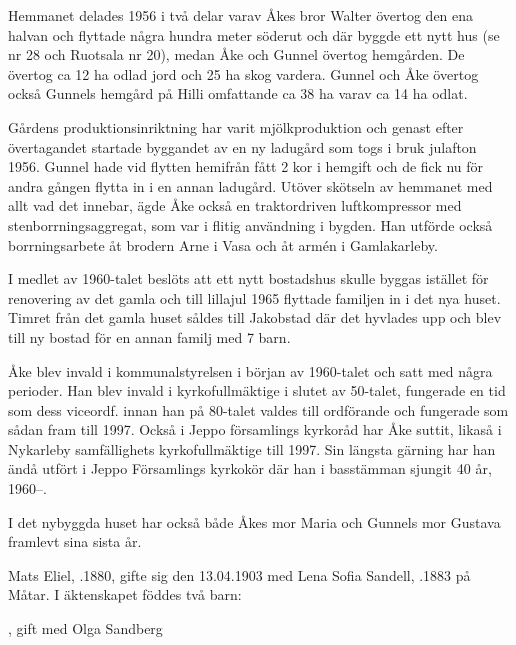 Hemmanet delades 1956 i två delar varav Åkes bror Walter övertog den ena halvan och flyttade några hundra meter söderut och där byggde ett nytt hus (se nr 28 och Ruotsala nr 20), medan Åke och Gunnel övertog hemgården. De övertog ca 12 ha odlad jord och 25 ha skog vardera. Gunnel och Åke övertog också Gunnels hemgård på Hilli omfattande ca 38 ha varav ca 14 ha odlat.

Gårdens produktionsinriktning har varit mjölkproduktion och genast efter övertagandet startade byggandet av en ny ladugård som togs i bruk julafton 1956. Gunnel hade vid flytten hemifrån fått 2 kor i hemgift och de fick nu för andra gången flytta in i en annan ladugård. Utöver skötseln av hemmanet med allt vad det innebar, ägde Åke också en traktordriven luftkompressor med stenborrningsaggregat, som var i flitig användning i bygden. Han utförde också borrningsarbete åt brodern Arne i Vasa och åt armén i Gamlakarleby.

I medlet av 1960-talet beslöts att ett nytt bostadshus skulle byggas istället för renovering av det gamla och till lillajul 1965 flyttade familjen in i det nya huset. Timret från det gamla huset såldes till Jakobstad där det hyvlades upp och blev till ny bostad för en annan familj med 7 barn.

Åke blev invald i kommunalstyrelsen i början av 1960-talet och satt med några perioder. Han blev invald i kyrkofullmäktige i slutet av 50-talet, fungerade en tid som dess viceordf. innan han på 80-talet valdes till ordförande och fungerade som sådan fram till 1997. Också i Jeppo församlings kyrkoråd har Åke suttit, likaså i Nykarleby samfällighets kyrkofullmäktige till 1997. Sin längsta gärning har han ändå utfört i Jeppo Församlings kyrkokör där han i basstämman sjungit 40 år, 1960--.
\begin{jhchildren}
  \item {}
  \item {}
  \item {}
\end{jhchildren}

I det nybyggda huset har också både Åkes mor Maria och Gunnels mor Gustava framlevt sina sista år.




Mats Eliel, .1880, gifte sig den 13.04.1903 med Lena Sofia Sandell, .1883 på Måtar. I äktenskapet föddes två barn:
\begin{jhchildren}
  \item {}, gift med Olga Sandberg
  \item {}
\end{jhchildren}

